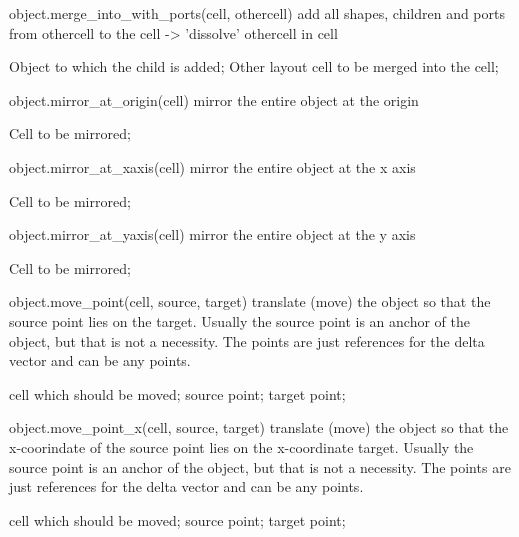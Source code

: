 \begin{APIfunc}{object.merge\_into\_with\_ports(cell, othercell)}
    add all shapes, children and ports from othercell to the cell -> 'dissolve' othercell in cell
    \begin{APIparameters}
            Object to which the child is added;
            Other layout cell to be merged into the cell;
    \end{APIparameters}
\end{APIfunc}
\begin{APIfunc}{object.mirror\_at\_origin(cell)}
    mirror the entire object at the origin
    \begin{APIparameters}
            Cell to be mirrored;
    \end{APIparameters}
\end{APIfunc}
\begin{APIfunc}{object.mirror\_at\_xaxis(cell)}
    mirror the entire object at the x axis
    \begin{APIparameters}
            Cell to be mirrored;
    \end{APIparameters}
\end{APIfunc}
\begin{APIfunc}{object.mirror\_at\_yaxis(cell)}
    mirror the entire object at the y axis
    \begin{APIparameters}
            Cell to be mirrored;
    \end{APIparameters}
\end{APIfunc}
\begin{APIfunc}{object.move\_point(cell, source, target)}
    translate (move) the object so that the source point lies on the target. Usually the source point is an anchor of the object, but that is not a necessity. The points are just references for the delta vector and can be any points.
    \begin{APIparameters}
            cell which should be moved;
            source point;
            target point;
    \end{APIparameters}
\end{APIfunc}
\begin{APIfunc}{object.move\_point\_x(cell, source, target)}
    translate (move) the object so that the x-coorindate of the source point lies on the x-coordinate target. Usually the source point is an anchor of the object, but that is not a necessity. The points are just references for the delta vector and can be any points.
    \begin{APIparameters}
            cell which should be moved;
            source point;
            target point;
    \end{APIparameters}
\end{APIfunc}
